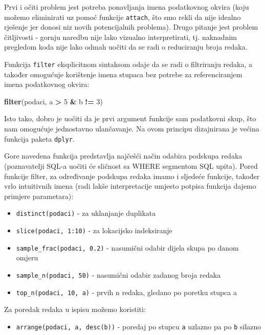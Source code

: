\documentclass[]{book}
\newenvironment{Shaded}{\begin{snugshade}}{\end{snugshade}}
\newcommand{\KeywordTok}[1]{\textcolor[rgb]{0.13,0.29,0.53}{\textbf{#1}}}
\newcommand{\DecValTok}[1]{\textcolor[rgb]{0.00,0.00,0.81}{#1}}
\newcommand{\StringTok}[1]{\textcolor[rgb]{0.31,0.60,0.02}{#1}}
\newcommand{\OperatorTok}[1]{\textcolor[rgb]{0.81,0.36,0.00}{\textbf{#1}}}
\newcommand{\NormalTok}[1]{#1}
\providecommand{\tightlist}{%
  \setlength{\itemsep}{0pt}\setlength{\parskip}{0pt}}
\theoremstyle{definition}
\theoremstyle{definition}
\theoremstyle{definition}
\theoremstyle{remark}
\begin{document}
Prvi i očiti problem jest potreba ponavljanja imena podatkovnog okvira
(koju možemo eliminirati uz pomoć funkcije \texttt{attach}, što smo
rekli da nije idealno rješenje jer donosi niz novih potencijalnih
problema). Drugo pitanje jest problem čitljivosti - gornju naredbu nije
lako vizualno interpretirati, tj. naknadnim pregledom koda nije lako
odmah uočiti da se radi o reduciranju broja redaka.

Funkcija \texttt{filter} eksplicitnom sintaksom odaje da se radi o
filtriranju redaka, a također omogućuje korištenje imena stupaca bez
potrebe za referenciranjem imena podatkovnog okvira:

\begin{Shaded}
\begin{Highlighting}[]
\KeywordTok{filter}\NormalTok{(podaci, a }\OperatorTok{>}\StringTok{ }\DecValTok{5} \OperatorTok{&}\StringTok{ }\NormalTok{b }\OperatorTok{!=}\StringTok{ }\DecValTok{3}\NormalTok{)}
\end{Highlighting}
\end{Shaded}

Isto tako, dobro je uočiti da je prvi argument funkcije sam podatkovni
skup, što nam omogućuje jednostavno ulančavanje. Na ovom principu
dizajnirana je većina funkcija paketa \texttt{dplyr}.

Gore navedena funkcija predstavlja najčešći način odabira podskupa
redaka (poznavatelji SQL-a uočiti će sličnost sa WHERE segmentom SQL
upita). Pored funkcije filter, za određivanje podskupa redaka imamo i
sljedeće funkcije, također vrlo intuitivnih imena (radi lakše
interpretacije umjesto potpisa funkcija dajemo primjere parametara):

\begin{itemize}
\tightlist
\item
  \texttt{distinct(podaci)} - za uklanjanje duplikata
\item
  \texttt{slice(podaci,\ 1:10)} - za lokacijsko indeksiranje
\item
  \texttt{sample\_frac(podaci,\ 0.2)} - nasumični odabir dijela skupa po
  danom omjeru
\item
  \texttt{sample\_n(podaci,\ 50)} - nasumični odabir zadanog broja
  redaka
\item
  \texttt{top\_n(podaci,\ 10,\ a)} - prvih n redaka, gledano po poretku
  stupca a
\end{itemize}

Za poredak redaka u ispisu možemo koristiti:

\begin{itemize}
\tightlist
\item
  \texttt{arrange(podaci,\ a,\ desc(b))} - poredaj po stupcu \texttt{a}
  uzlazno pa po \texttt{b} silazno
\end{itemize}
\end{document}
